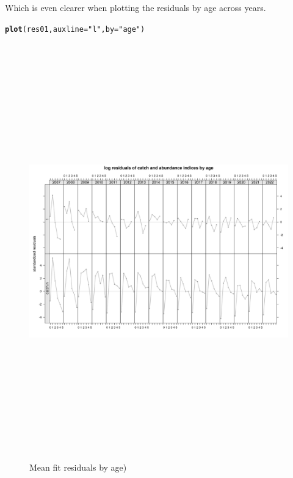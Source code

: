 \documentclass[a4paper,english,11pt]{article}\usepackage[]{graphicx}\usepackage[]{xcolor}
\makeatletter
\newcommand{\hlsng}[1]{\textcolor[rgb]{0.192,0.494,0.8}{#1}}%
\newcommand{\hldef}[1]{\textcolor[rgb]{0.345,0.345,0.345}{#1}}%
\newcommand{\hlkwc}[1]{\textcolor[rgb]{0.333,0.667,0.333}{#1}}%
\newcommand{\hlkwd}[1]{\textcolor[rgb]{0.737,0.353,0.396}{\textbf{#1}}}%
\newenvironment{kframe}{%
 \def\at@end@of@kframe{}%
 \ifinner\ifhmode%
  \def\at@end@of@kframe{\end{minipage}}%
  \begin{minipage}{\columnwidth}%
 \fi\fi%
 \def\FrameCommand##1{\hskip\@totalleftmargin \hskip-\fboxsep
 \colorbox{shadecolor}{##1}\hskip-\fboxsep
     \hskip-\linewidth \hskip-\@totalleftmargin \hskip\columnwidth}%
 \MakeFramed {\advance\hsize-\width
   \@totalleftmargin\z@ \linewidth\hsize
   \@setminipage}}%
 {\par\unskip\endMakeFramed%
 \at@end@of@kframe}
\newenvironment{knitrout}{}{} %
\makeatother
\begin{document}
Which is even clearer when plotting the residuals by age across years.

\begin{knitrout}
\color{fgcolor}\begin{kframe}
\begin{alltt}
\hlkwd{plot}\hldef{(res01,} \hlkwc{auxline} \hldef{=} \hlsng{"l"}\hldef{,} \hlkwc{by} \hldef{=} \hlsng{"age"}\hldef{)}
\end{alltt}
\end{kframe}\begin{figure}[H]

{\centering \includegraphics[width=25cm,height=18cm,angle=90]{figure/meanresbyage-1} 

}

\caption[Mean fit residuals by age)]{Mean fit residuals by age)}\label{fig:meanresbyage}
\end{figure}

\end{knitrout}
\end{document}
